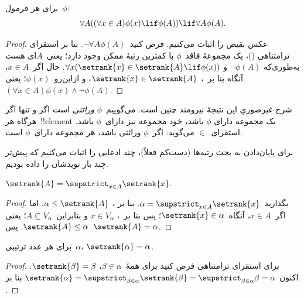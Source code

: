 \documentclass[../../../include/open-logic-section]{subfiles}
\begin{document}
\begin{thm}
برای هر فرمول~$\phi$:
\[
	\forall A((\forall x \in A)\phi(x) \lif \phi(A)) \lif \forall A \phi(A).
\]
\end{thm}

\begin{proof}
عکس نقیض را اثبات می‌کنیم. فرض کنید~$\lnot\forall A\phi(A)$. بنا بر
استقرای ترامتناهی
()، یک مجموعهٔ فاقد~$\phi$ با
کمترین رتبهٔ ممکن وجود دارد؛ یعنی~$A$ای هست به‌طوری‌که
$\lnot\phi(A)$ و
$\forall x(\setrank{x}\in\setrank{A}\lif\phi(x))$. حال اگر~$x\in A$،
آنگاه بنا بر~،
$\setrank{x}\in\setrank{A}$، و ازاین‌رو~$\phi(x)$؛ یعنی
$(\forall x\in A)\phi(x)\land\lnot\phi(A)$.
\end{proof}\noindent
شرح غیرصوریِ این نتیجهٔ نیرومند چنین است. می‌گوییم~$\phi$
\emph{وراثتی} است اگر و تنها اگر هرگاه هر~!!{element} یک مجموعه دارای
$\phi$ باشد، خود مجموعه نیز دارای~$\phi$ باشد. استقرای~$\in$ می‌گوید:
اگر~$\phi$ وراثتی باشد، هر مجموعه دارای~$\phi$ است.

برای پایان‌دادن به بحث رتبه‌ها (دست‌کم فعلاً)، چند ادعایی را اثبات می‌کنیم
که پیش‌تر چند بار نویدشان را داده بودیم.

\begin{prop}
$\setrank{A}=\supstrict_{x\in A}\setrank{x}$.
\end{prop}

\begin{proof}
بگذارید~$\alpha=\supstrict_{x\in A}\setrank{x}$. بنا بر
، $\alpha\leq\setrank{A}$. اما اگر~$x\in A$،
آنگاه~$\setrank{x}\in\alpha$؛ پس بنا بر~،
$x\in V_\alpha$ و بنابراین~$A\subseteq V_\alpha$؛ یعنی
$\setrank{A}\leq\alpha$. پس~$\setrank{A}=\alpha$.
\end{proof}

\begin{cor}
برای هر عدد ترتیبی~$\alpha$، $\setrank{\alpha}=\alpha$.
\end{cor}

\begin{proof}
برای استقرای ترامتناهی فرض کنید برای همهٔ~$\beta\in\alpha$،
$\setrank{\beta}=\beta$. اکنون
$\setrank{\alpha}=\supstrict_{\beta\in\alpha}\setrank{\beta}=
\supstrict_{\beta\in\alpha}\beta=\alpha$ بنا بر
.
%
\end{proof}
\end{document}
